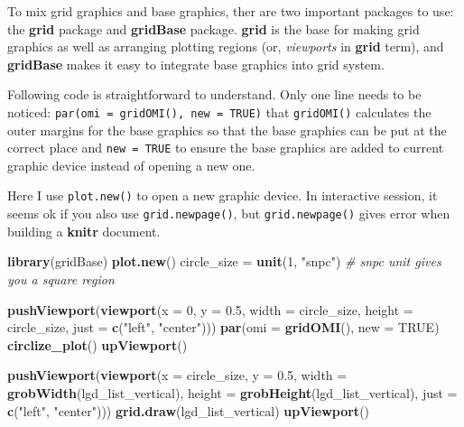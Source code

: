 \documentclass[]{book}
\newenvironment{Shaded}{\begin{snugshade}}{\end{snugshade}}
\newcommand{\KeywordTok}[1]{\textcolor[rgb]{0.13,0.29,0.53}{\textbf{#1}}}
\newcommand{\DataTypeTok}[1]{\textcolor[rgb]{0.13,0.29,0.53}{#1}}
\newcommand{\DecValTok}[1]{\textcolor[rgb]{0.00,0.00,0.81}{#1}}
\newcommand{\FloatTok}[1]{\textcolor[rgb]{0.00,0.00,0.81}{#1}}
\newcommand{\StringTok}[1]{\textcolor[rgb]{0.31,0.60,0.02}{#1}}
\newcommand{\CommentTok}[1]{\textcolor[rgb]{0.56,0.35,0.01}{\textit{#1}}}
\newcommand{\OtherTok}[1]{\textcolor[rgb]{0.56,0.35,0.01}{#1}}
\newcommand{\NormalTok}[1]{#1}
\theoremstyle{definition}
\theoremstyle{definition}
\theoremstyle{remark}
\begin{document}
To mix grid graphics and base graphics, ther are two important packages
to use: the \textbf{grid} package and \textbf{gridBase} package.
\textbf{grid} is the base for making grid graphics as well as arranging
plotting regions (or, \emph{viewports} in \textbf{grid} term), and
\textbf{gridBase} makes it easy to integrate base graphics into grid
system.

Following code is straightforward to understand. Only one line needs to
be noticed: \texttt{par(omi\ =\ gridOMI(),\ new\ =\ TRUE)} that
\texttt{gridOMI()} calculates the outer margins for the base graphics so
that the base graphics can be put at the correct place and
\texttt{new\ =\ TRUE} to ensure the base graphics are added to current
graphic device instead of opening a new one.

Here I use \texttt{plot.new()} to open a new graphic device. In
interactive session, it seems ok if you also use
\texttt{grid.newpage()}, but \texttt{grid.newpage()} gives error when
building a \textbf{knitr} document.

\begin{Shaded}
\begin{Highlighting}[]
\KeywordTok{library}\NormalTok{(gridBase)}
\KeywordTok{plot.new}\NormalTok{()}
\NormalTok{circle_size =}\StringTok{ }\KeywordTok{unit}\NormalTok{(}\DecValTok{1}\NormalTok{, }\StringTok{"snpc"}\NormalTok{) }\CommentTok{# snpc unit gives you a square region}

\KeywordTok{pushViewport}\NormalTok{(}\KeywordTok{viewport}\NormalTok{(}\DataTypeTok{x =} \DecValTok{0}\NormalTok{, }\DataTypeTok{y =} \FloatTok{0.5}\NormalTok{, }\DataTypeTok{width =}\NormalTok{ circle_size, }\DataTypeTok{height =}\NormalTok{ circle_size,}
    \DataTypeTok{just =} \KeywordTok{c}\NormalTok{(}\StringTok{"left"}\NormalTok{, }\StringTok{"center"}\NormalTok{)))}
\KeywordTok{par}\NormalTok{(}\DataTypeTok{omi =} \KeywordTok{gridOMI}\NormalTok{(), }\DataTypeTok{new =} \OtherTok{TRUE}\NormalTok{)}
\KeywordTok{circlize_plot}\NormalTok{()}
\KeywordTok{upViewport}\NormalTok{()}

\KeywordTok{pushViewport}\NormalTok{(}\KeywordTok{viewport}\NormalTok{(}\DataTypeTok{x =}\NormalTok{ circle_size, }\DataTypeTok{y =} \FloatTok{0.5}\NormalTok{, }\DataTypeTok{width =} \KeywordTok{grobWidth}\NormalTok{(lgd_list_vertical), }
    \DataTypeTok{height =} \KeywordTok{grobHeight}\NormalTok{(lgd_list_vertical), }\DataTypeTok{just =} \KeywordTok{c}\NormalTok{(}\StringTok{"left"}\NormalTok{, }\StringTok{"center"}\NormalTok{)))}
\KeywordTok{grid.draw}\NormalTok{(lgd_list_vertical)}
\KeywordTok{upViewport}\NormalTok{()}
\end{Highlighting}
\end{Shaded}
\end{document}
